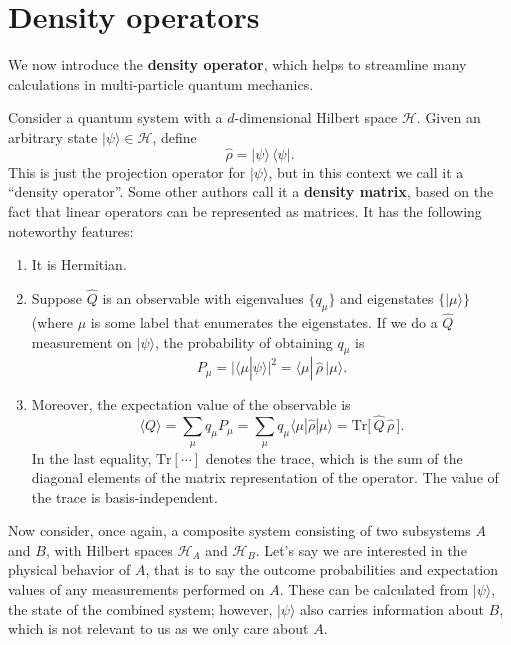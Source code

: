 \documentclass[pra,12pt]{revtex4-2}
\begin{document}
\section{Density operators}

We now introduce the \textbf{density operator}, which helps to
streamline many calculations in multi-particle quantum mechanics.

Consider a quantum system with a $d$-dimensional Hilbert space
$\mathscr{H}$.  Given an arbitrary state $|\psi\rangle \in
\mathscr{H}$, define
\begin{equation}
  \hat{\rho} = |\psi\rangle\, \langle\psi|.
  \label{rho_pure}
\end{equation}
This is just the projection operator for $|\psi\rangle$, but in this
context we call it a ``density operator''.  Some other authors call it
a \textbf{density matrix}, based on the fact that linear operators can
be represented as matrices.  It has the following noteworthy features:

\begin{enumerate}
\item It is Hermitian.  

\item Suppose $\hat{Q}$ is an observable with eigenvalues $\{q_\mu\}$
  and eigenstates $\{|\mu\rangle\}$ (where $\mu$ is some label that
  enumerates the eigenstates.  If we do a $\hat{Q}$ measurement on
  $|\psi\rangle$, the probability of obtaining $q_\mu$ is
  \begin{equation}
    P_\mu = \big|\langle \mu | \psi\rangle\big|^2 =
    \langle \mu |\, \hat{\rho}\, | \mu \rangle.
    \label{Pi_rho}
  \end{equation}

\item Moreover, the expectation value of the observable is
  \begin{equation}
    \langle Q\rangle
    = \sum_\mu q_\mu P_\mu
    = \sum_\mu q_\mu \langle \mu | \hat{\rho}| \mu \rangle
    = \mathrm{Tr}\big[\,\hat{Q} \, \hat{\rho}\,\big].
    \label{Qexpt}
  \end{equation}
  In the last equality, $\mathrm{Tr}[\cdots]$ denotes the trace, which
  is the sum of the diagonal elements of the matrix representation of
  the operator.  The value of the trace is basis-independent.
\end{enumerate}

Now consider, once again, a composite system consisting of two
subsystems $A$ and $B$, with Hilbert spaces $\mathscr{H}_A$ and
$\mathscr{H}_B$.  Let's say we are interested in the physical behavior
of $A$, that is to say the outcome probabilities and expectation
values of any measurements performed on $A$.  These can be calculated
from $|\psi\rangle$, the state of the combined system; however,
$|\psi\rangle$ also carries information about $B$, which is not
relevant to us as we only care about $A$.
\end{document}
